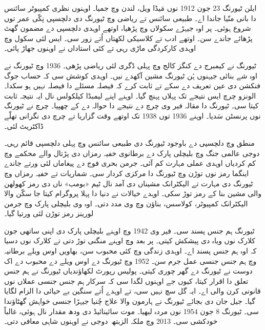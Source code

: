 \documentclass[../../../include/open-logic-section]{subfiles}
\begin{document}


ایلن ٹیورنگ 23 جون 1912 نوں مَیڈا ویل، لندن وچ جمیا۔ اوہنوں نظری کمپیوٹر سائنس دا بانی منّیا جاندا اے۔ طبیعی سائنس تے ریاضی وچ ٹیورنگ دی دلچسپی نِکّی عمر توں شروع ہوئی۔ پر اوہ جیہڑے سکولاں وچ پڑھیا، اوتھے اوہدی دلچسپی دے مضمون گھٹ پڑھائے جاندے سن۔ اوتھے ادب تے کلاسیکی لکھتاں اُتے زور سی۔ ایس لئی سکول وچ اوہدی کارکردگی ماڑی رہی تے کئی استاداں نے اوہنوں جھاڑ پائی۔


ٹیورنگ نے کیمبرج دے کنگز کالج وچ پہلی ڈگری لئی ریاضی پڑھی۔ 1936 وچ ٹیورنگ نے اوہ شے بنائی جیہنوں ہُن ٹیورنگ مشین آکھدے نیں۔ اوہدی کوشش سی کہ حساب جوگ فنکشن دی عین تعریف دے سکے تے ثابت کرے کہ فیصلہ مسئلے دا فیصلہ نہیں ہو سکدا۔ الونزو چرچ ایس نتیجے تک پہلاں پہنچ گیا۔ اوہنے اپنے لیمبڈا کیلکولس نال ایہ نتیجہ ثابت کیتا سی۔ ٹیورنگ دا مقالہ فیر وی چرچ دے نتیجے دا حوالہ دے کے چھپیا۔ چرچ نے ٹیورنگ نوں پرنسٹن سَدیا۔ اوہنے 1936 توں 1938 تک اوتھے وقت گزاریا تے چرچ دی نگرانی تھلّے ڈاکٹریٹ لئی۔

منطق وچ دلچسپی دے باوجود ٹیورنگ دی طبیعی سائنس وچ پہلی دلچسپی قائم رہی۔ دوجی عالمی جنگ وچ بلیچلی پارک دے برطانوی خفیہ رمزاں دی پڑتال والے محکمے وچ کم کردیاں اوہدی عملی مہارت کم آئی۔ جرمن بحری فوج دے پیغاماں لئی ورتے جاندے اینگما رمز نوں توڑن وچ ٹیورنگ دا مرکزی کردار سی۔ شماریات تے خفیہ رمزاں وچ ٹیورنگ دی مہارت تے الیکٹرانک مشیناں دی آمد نال ٹیم «بومب» ناں دی رمز کھولھن والی مشین بنا کے رمز توڑ سکی۔ اوہدے خیالات نے دنیا دا پہلا پروگرام کیتا جا سکّن والا الیکٹرانک کمپیوٹر، کولاسس، بناؤن وچ وی مدد دتی۔ اوہ وی بلیچلی پارک وچ جرمن لورینز رمز توڑن لئی ورتیا گیا۔

ٹیورنگ ہم جنس پسند سی۔ فیر وی 1942 وچ اوہنے بلیچلی پارک دی اپنی ساتھی جون کلارک نوں ویاہ دی پیشکش کیتی۔ پر بعد وچ اوہنے منگنی توڑ دتی تے کلارک نوں دسیا کہ اوہ ہم جنس پسند اے۔ اوہدی زندگی وچ کئی محبوب سن، بھاویں اوس ویلے برطانیہ وچ ہم جنس جنسی عمل جرم سن۔ 1952 وچ ٹیورنگ دے اوس ویلے دے محبوب دے اک دوست نے ٹیورنگ دے گھر چوری کیتی۔ پولیس رپورٹ لکھاؤندیاں ٹیورنگ نے ہم جنس تعلق دا اقرار کیتا، کیوں جے اوہنوں لگدا سی کہ سرکار ہم جنس جنسی عملاں نوں قانونی کرن والی اے۔ ایہ گل سچ نہیں سی، تے اوہدے اُتے سنگین بے حیائی دا الزام لگایا گیا۔ جیل جان دی بجائے ٹیورنگ نے ہارمون والا علاج چُنیا جیہڑا جنسی خواہش گھٹاؤندا سی۔ ٹیورنگ 8 جون 1954 نوں مردہ لبھیا۔ موت سائینائیڈ دی ودھ مقدار نال ہوئی، غالباً خودکشی سی۔ 2013 وچ ملکہ الزبتھ~دوجی نے اوہنوں شاہی معافی دتی۔
\end{document}

